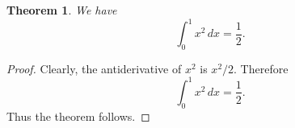 \documentclass{article}
\newtheorem{theorem}{Theorem}
\begin{document}
\begin{theorem}
We have
\[
\int_0^1 x^2 \, dx = \frac{1}{2}.
\]
\end{theorem}

\begin{proof}
Clearly, the antiderivative of $x^2$ is $x^2/2$.
Therefore
\[
\int_0^1 x^2 \, dx = \frac{1}{2}.
\]
Thus the theorem follows.
\end{proof}
\end{document}
